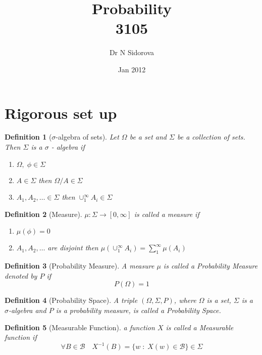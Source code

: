 \documentclass[12pt]{article}
\newtheorem{definition}{Definition}[section]
\begin{document}
\title{Probability \\ 3105}
\author{ Dr N Sidorova}
\date{Jan 2012}
\maketitle

\tableofcontents
\setcounter{tocdepth}{4}
\newpage

\section{Rigorous set up}

\begin{definition}[$\sigma$-algebra of sets]
Let $\Omega$ be a set and $\Sigma$ be a collection of sets. Then $\Sigma$ is a $\sigma$ - algebra if
\begin{enumerate}
\item $\Omega, \; \phi \in \Sigma$
\item $A \in \Sigma$ then $\Omega/A \in \Sigma$
\item $A_1, A_2, \dots \in \Sigma$ then $\cup_{1}^{\infty}A_i \in \Sigma$
\end{enumerate}
\end{definition}

\begin{definition}[Measure]
$\mu:\Sigma \rightarrow [0,\infty]$ is called a measure if
\begin{enumerate}
\item $\mu(\phi) = 0$
\item $A_1, A_2, \dots$ are disjoint then $\mu(\cup_{1}^{\infty}A_i) = \sum_{1}^{\infty}\mu(A_i)$
\end{enumerate}
\end{definition}

\begin{definition}[Probability Measure] 
A measure $\mu$ is called a Probability Measure denoted by $P$ if \[P(\Omega) =1\]
\end{definition}

\begin{definition}[Probability Space]
A triple $(\Omega, \Sigma, P)$, where $\Omega$ is a set, $\Sigma$ is a $\sigma$-algebra and $P$ is a probability measure, is called a Probability Space.  
\end{definition}

\begin{definition}[Measurable Function]
a function $X$ is called a Measurable function if 
\[\forall B \in \mathcal{B} \quad X^{-1}(B) = \{w\;:\; X(w) \in \mathcal{B} \} \in \Sigma \]
\end{definition}
\end{document}
